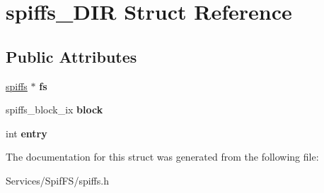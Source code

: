 \hypertarget{structspiffs___d_i_r}{}\section{spiffs\+\_\+\+D\+I\+R Struct Reference}
\label{structspiffs___d_i_r}
\subsection*{Public Attributes}
\begin{DoxyCompactItemize}
\item 
\hypertarget{structspiffs___d_i_r_ad006821d5233083eaf04fa13fae90d88}{}\hyperlink{structspiffs}{spiffs} $\ast$ {\bfseries fs}\label{structspiffs___d_i_r_ad006821d5233083eaf04fa13fae90d88}

\item 
\hypertarget{structspiffs___d_i_r_a822b1a3cdc78d84d377af471cde6cbc0}{}spiffs\+\_\+block\+\_\+ix {\bfseries block}\label{structspiffs___d_i_r_a822b1a3cdc78d84d377af471cde6cbc0}

\item 
\hypertarget{structspiffs___d_i_r_a14d25754d25e2dab074381fd20395c2e}{}int {\bfseries entry}\label{structspiffs___d_i_r_a14d25754d25e2dab074381fd20395c2e}

\end{DoxyCompactItemize}


The documentation for this struct was generated from the following file\+:\begin{DoxyCompactItemize}
\item 
Services/\+Spif\+F\+S/spiffs.\+h\end{DoxyCompactItemize}
